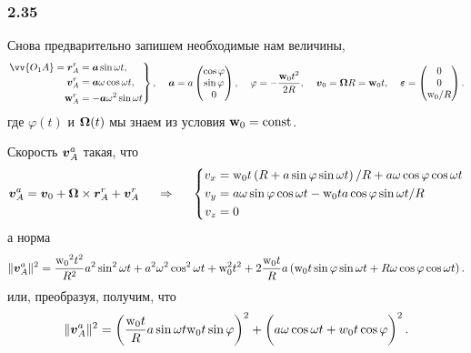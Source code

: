 \subsubsection*{2.35}

Снова предварительно запишем необходимые нам величины,
$$
\left.\begin{aligned}
    \vv{O_1A} = \vc{r}_A^r &= \vc{a} \sin \omega t, \\
    \vc{v}_A^r &= \vc{a} \omega \cos \omega t, \\
    \vc{\mathrm{w}}_A^r &= - \vc{a} \omega^2 \sin \omega t\\
\end{aligned}\right\}, \hspace{0.4cm} 
\vc{a} = a \begin{pmatrix}
    \cos \varphi \\ \sin \varphi \\ 0
\end{pmatrix}, \hspace{0.4cm} 
\varphi = - \frac{\vc{\mathrm{w}}_0 t^2}{2R},\hspace{0.4cm} 
\vc{v}_0 = \vc{\Omega} R = \vc{\mathrm{w}}_0 t,\hspace{0.4cm} 
\vc{\varepsilon} = \begin{pmatrix}
    0 \\ 0 \\ \mathrm{w}_0 / R
\end{pmatrix}.
$$
где $\varphi(t)$ и $\mbox{\boldmath $\Omega$}(t)$ мы знаем из условия $\mbox{\boldmath $\mathrm{w}$}_0 = \text{const}$.

Скорость $\mbox{\boldmath $v$}_A^a$ такая, что
$$
    \mbox{\boldmath $v$}_A^a = \mbox{\boldmath $v$}_0 + \mbox{\boldmath $\Omega$} \times  \mbox{\boldmath $r$}_A^r 
    + \mbox{\boldmath $v$}_A^r 
    \hspace{0.5cm} \Rightarrow \hspace{0.5cm} 
    \left\{\begin{aligned}
        v_x &= \mathrm{w_0} t\left(
            R + a \sin \varphi \sin \omega t
        \right) / R + a \omega \cos \varphi \cos \omega t \\
        v_y &= a \omega \sin \varphi \cos \omega t - 
        \mathrm{w}_0 t a \cos \varphi \sin \omega t / R\\
        v_z &= 0 \\
    \end{aligned}\right.
$$
а норма 
$$
    \|\mbox{\boldmath $v$}_A^a\|^2 = \frac{\mathrm{w_0}^2 t^2}{R^2}  a^2 \sin^2 \omega t +
    a^2 \omega^2 \cos^2 \omega t +
    \mathrm{w}_0^2 t^2 +
    2 \frac{\mathrm{w_0}t}{R}a \left(
        \mathrm{w}_0 t \sin \varphi \sin \omega t + R \omega \cos \varphi \cos \omega t
    \right).
$$
или, преобразуя, получим, что
$$
    \|\vc{v}_A^a\|^2 = 
    \left(
        \frac{\mathrm{w}_0 t}{R} a \sin \omega t  \mathrm{w}_0 t \sin \varphi 
    \right)^2 + \left( \vphantom{\frac{1}{2}}
        a \omega \cos \omega t + w_0 t \cos \varphi
    \right)^2.
$$

